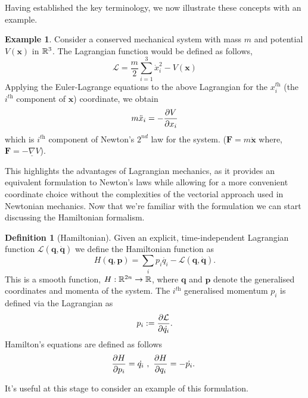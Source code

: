 \documentclass[12pt,oneside]{report}
\theoremstyle{definition}
\newtheorem{definition}{Definition}
\newtheorem{example}{Example}
\begin{document}
\noindent Having established the key terminology, we now illustrate these concepts with an example.

\begin{example}\label{example 1}
    Consider a conserved mechanical system with mass $m$ and potential $V(\textbf{x})$ in $\mathbb{R}^{3}$. The Lagrangian function would be defined as follows,
    \begin{equation}
        \mathcal{L} = \frac{m}{2}\sum_{i=1}^{3}\dot{x}_{i}^{2} - V(\textbf{x})
    \end{equation}
   Applying the Euler-Lagrange equations to the above Lagrangian for the $x_{i}^{\textit{th}}$ (the $i^{\textit{th}}$ component of $\textbf{x}$)
  coordinate, we obtain
    $$ m\ddot{x}_{i} = -\displaystyle\frac{\partial V}{\partial x_{i}}$$
    which is $i^{\textit{th}}$ component of Newton's $2^{\textit{nd}}$ law for the system. ($ \textbf{F} = m\ddot{\textbf{x}}$ where, $\textbf{F} = -\underline{\nabla} V$). 
\end{example}

This highlights the advantages of Lagrangian mechanics, as it provides an equivalent formulation to Newton’s laws while allowing for a more convenient coordinate choice without the complexities of the vectorial approach used in Newtonian mechanics. Now that we're familiar with the formulation we can start discussing the Hamiltonian formalism.

\begin{definition}[Hamiltonian]\label{Hamiltonian}
    Given an explicit, time-independent Lagrangian function $\mathcal{L}(\textbf{q}, \dot{\textbf{q}})$ we define the Hamiltonian function as
    \begin{equation}\label{Def_Ham}
        H(\textbf{q},\textbf{p}) = \sum_{i} p_{i} \dot{q_{i}} - \mathcal{L}(\textbf{q}, \dot{\textbf{q}}).
    \end{equation}
    This is a smooth function, $H:\mathbb{R}^{2n} \rightarrow \mathbb{R} $, where $\textbf{q}$ and $\textbf{p}$ denote the generalised coordinates and momenta of the system. The $i^{\textit{th}}$ generalised momentum $p_{i}$ is defined via the Lagrangian as
    $$ p_{i} := \displaystyle\frac{\partial \mathcal{L}}{\partial \dot{q_{i}}} .$$
    Hamilton's equations are defined as follows
    \begin{equation} \label{1.4}
 \pd{H}{p_{i}} = \dot{q_{i}}  \ , \ \pd{H}{q_{i}} = -\dot{p_{i}}. \    
\end{equation} 
\end{definition}

\noindent It's useful at this stage to consider an example of this formulation.
\end{document}

